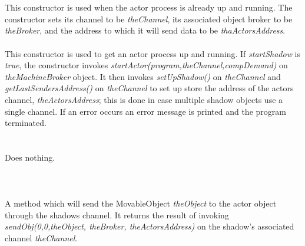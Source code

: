   \\
\\
This constructor is used when the actor process is already up and
running. The constructor sets its channel to be {\em theChannel}, its 
associated object broker to be {\em theBroker}, and the address to
which it will send data to be {\em thaActorsAddress}. \\ 

  \\
This constructor is used to get an actor process up and running. If 
{\em startShadow} is {\em true}, the constructor invokes 
{\em startActor(program,theChannel,compDemand)} on  
{\em theMachineBroker} object. It then invokes {\em setUpShadow()} on
{\em theChannel} and {\em getLastSendersAddress()} on {\em theChannel}
to set up store the address of the actors channel, {\em
theActorsAddress}; this is done in case multiple shadow objects use a
single channel. 
If an error occurs an error message is printed and the program terminated.\\ 

 \\
\\ 
Does nothing. \\

  \\

  \\
\\
A method which will send the MovableObject {\em theObject} to
the actor object through the shadows channel. It returns the
result of invoking {\em sendObj(0,0,theObject, theBroker, theActorsAddress)} on the
shadow's associated channel {\em theChannel}. \\ 


